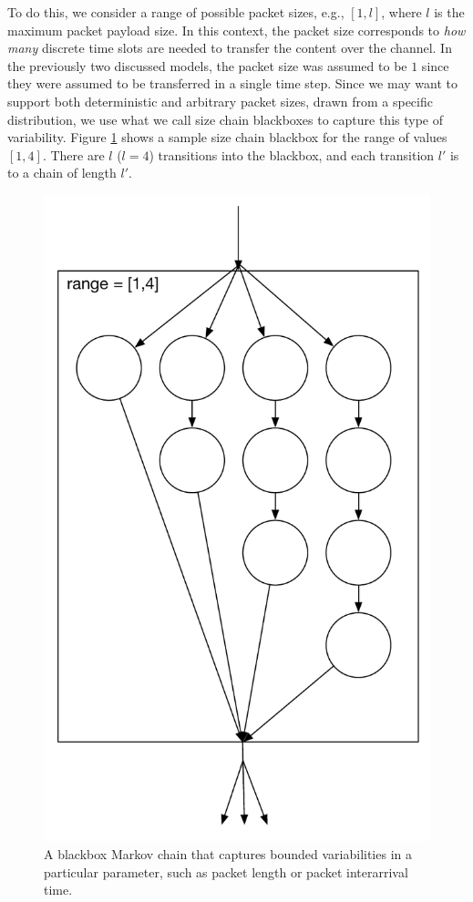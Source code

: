 \documentclass[conference]{IEEEtran}
\begin{document}
To do this, we consider a range of possible packet sizes, e.g., $[1,l]$, where $l$ is the maximum packet payload size. In this context, the packet size corresponds to \emph{how many} discrete time slots are needed to transfer the content over the channel. In the previously two discussed models, the packet size was assumed to be $1$ since they were assumed to be transferred in a single time step. Since we may want to support both deterministic and arbitrary packet sizes, drawn from a specific distribution, we use what we call size chain blackboxes to capture this type of variability. Figure \ref{fig:size_chain} shows a sample size chain blackbox for the range of values $[1,4]$. There are $l$ ($l = 4$) transitions into the blackbox, and each transition $l'$ is to a chain of length $l'$. 

\begin{figure}
\begin{center}
\includegraphics[scale=0.4]{../sketches/size_chain_old.pdf}
\caption{A blackbox Markov chain that captures bounded variabilities in a particular parameter, such as packet length or packet interarrival time.}
\label{fig:size_chain}
\end{center}
\end{figure}
\end{document}
